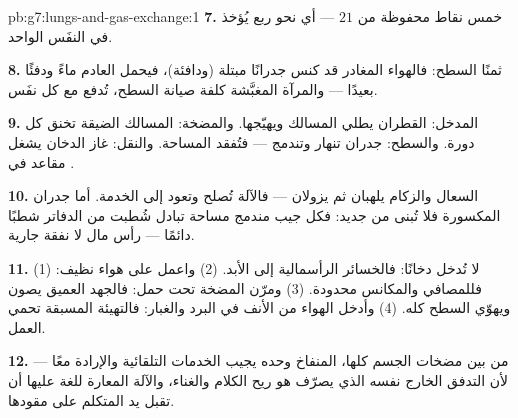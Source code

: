 \begin{solution}{pb:g7:lungs-and-gas-exchange:1}
\textbf{7.} خمس نقاط محفوظة من $21$ --- أي نحو ربع  
يُؤخذ في النفَس الواحد.

\textbf{8.} ثمنًا  السطح: فالهواء المغادر قد كنس جدرانًا
مبتلة (ودافئة)، فيحمل العادم ماءً ودفئًا بعيدًا --- والمرآة
المغبَّشة كلفة صيانة السطح، تُدفع مع كل نفَس.

\textbf{9.} المدخل: القطران يطلي المسالك ويهيّجها. والمضخة:
المسالك الضيقة تخنق كل دورة. والسطح: جدران  تنهار وتندمج
--- فتُفقد المساحة. والنقل: غاز الدخان يشغل مقاعد  في
.

\textbf{10.} السعال والزكام يلهبان ثم يزولان --- فالآلة تُصلح
وتعود إلى الخدمة. أما جدران  المكسورة فلا تُبنى من جديد:
فكل جيب مندمج مساحة تبادل شُطبت من الدفاتر شطبًا دائمًا --- رأس
مال لا نفقة جارية.

\textbf{11.} (1) لا تُدخل دخانًا: فالخسائر الرأسمالية إلى الأبد.
(2) واعمل على هواء نظيف: فللمصافي والمكانس  محدودة. (3) ومرّن
المضخة تحت حمل: فالجهد العميق يصون  ويهوّي السطح كله. (4)
وأدخل الهواء من الأنف في البرد والغبار: فالتهيئة المسبقة تحمي
العمل.

\textbf{12.} من بين مضخات الجسم كلها، المنفاخ وحده يجيب الخدمات
التلقائية والإرادة معًا --- لأن التدفق الخارج نفسه الذي يصرّف  هو ريح الكلام والغناء، والآلة المعارة للغة عليها أن
تقبل يد المتكلم على مقودها.
\end{solution}
